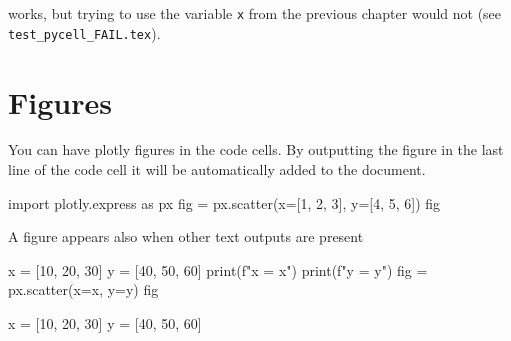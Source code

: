 \documentclass[oneside]{book}
\begin{document}
works, but trying to use the variable \texttt{x} from the previous chapter would not (see \texttt{test\_pycell\_FAIL.tex}).

\chapter{Figures}

You can have plotly figures in the code cells. By outputting the figure in the last line of the code cell it will be automatically added to the document.

\begin{pycell}
import plotly.express as px
fig = px.scatter(x=[1, 2, 3], y=[4, 5, 6])
fig
\end{pycell}

A figure appears also when other text outputs are present
\begin{pycell}
x = [10, 20, 30]
y = [40, 50, 60]
print(f"x = {x}")
print(f"y = {y}")
fig = px.scatter(x=x, y=y)
fig
\end{pycell}
\begin{pyexpectedoutput}
x = [10, 20, 30]
y = [40, 50, 60]
\end{pyexpectedoutput}
\end{document}
